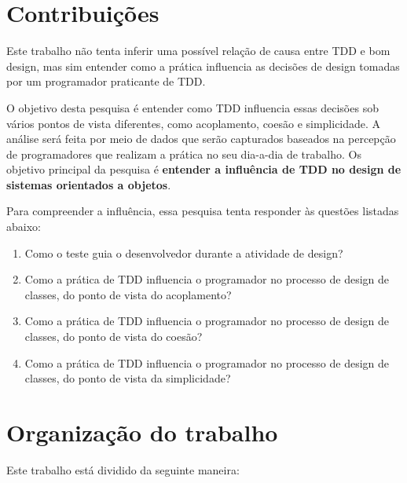 \section{Contribuições}

Este trabalho não tenta inferir uma possível relação de causa entre TDD e
bom design, mas sim entender como a prática influencia as decisões de 
design tomadas por um programador praticante de TDD.

O objetivo desta pesquisa é entender como TDD influencia essas decisões sob vários
pontos de vista diferentes, como acoplamento, coesão e simplicidade. 
A análise será feita por meio de dados que serão
capturados baseados na percepção de programadores que realizam a prática no seu
dia-a-dia de trabalho.
Os objetivo principal da pesquisa é \textbf{entender a influência de TDD no
design de sistemas orientados a objetos}.

Para compreender a influência, essa pesquisa tenta responder às questões listadas
abaixo:

\begin{enumerate}

  \item Como o teste guia o desenvolvedor durante a atividade de
  design?

  \item Como a prática de TDD influencia o programador no processo de 
  design de classes, do ponto de vista do acoplamento?

  \item Como a prática de TDD influencia o programador no processo de 
  design de classes, do ponto de vista do coesão?

  \item Como a prática de TDD influencia o programador no processo de 
  design de classes, do ponto de vista da simplicidade?

\end{enumerate}

\section{Organização do trabalho}

Este trabalho está dividido da seguinte maneira: 

